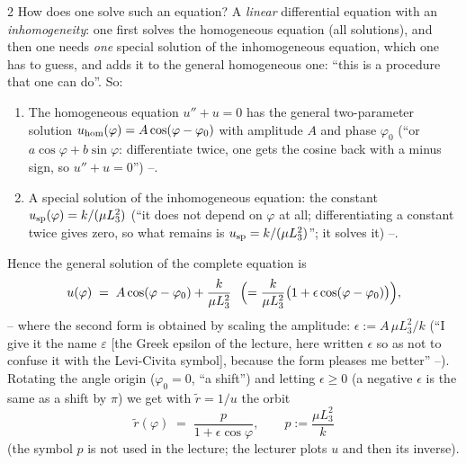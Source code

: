 \begin{paracol}{2}
How does one solve such an equation? A \emph{linear} differential equation with an \emph{inhomogeneity}: one first solves the homogeneous equation (all solutions), and then one needs \emph{one} special solution of the inhomogeneous equation, which one has to guess, and adds it to the general homogeneous one: ``this is a procedure that one can do''. So:
\begin{enumerate}
  \item The homogeneous equation $u''+u=0$ has the general two-parameter solution $u_{\rm hom}(\varphi)=A\cos(\varphi-\varphi_0)$ with amplitude $A$ and phase $\varphi_0$ (``or $a\cos\varphi+b\sin\varphi$: differentiate twice, one gets the cosine back with a minus sign, so $u''+u=0$'') --.
  \item A special solution of the inhomogeneous equation: the constant $u_{\rm sp}(\varphi)=k/(\mu L_3^2)$ (``it does not depend on $\varphi$ at all; differentiating a constant twice gives zero, so what remains is $u_{\rm sp}=k/(\mu L_3^2)$''; it solves it) --.
\end{enumerate}
Hence the general solution of the complete equation is
\begin{equation}\label{eq:tb-usol}
  u(\varphi)\;=\;A\cos(\varphi-\varphi_0)+\frac{k}{\mu L_3^2}\ \ \Bigl(=\frac{k}{\mu L_3^2}\bigl(1+\epsilon\cos(\varphi-\varphi_0)\bigr)\Bigr),
\end{equation}
-- where the second form is obtained by scaling the amplitude: $\epsilon:=A\,\mu L_3^2/k$ (``I give it the name $\varepsilon$ [the Greek epsilon of the lecture, here written $\epsilon$ so as not to confuse it with the Levi-Civita symbol], because the form pleases me better'' --). Rotating the angle origin ($\varphi_0=0$, ``a shift'') and letting $\epsilon\ge0$ (a negative $\epsilon$ is the same as a shift by $\pi$) we get with $\tilde r=1/u$ the orbit
\begin{equation}\label{eq:tb-orbit}
  \boxed{\;\tilde r(\varphi)\;=\;\frac{p}{1+\epsilon\cos\varphi},\qquad p:=\frac{\mu L_3^2}{k}\;}
\end{equation}
(the symbol $p$ is not used in the lecture; the lecturer plots $u$ and then its inverse).


\end{paracol}
